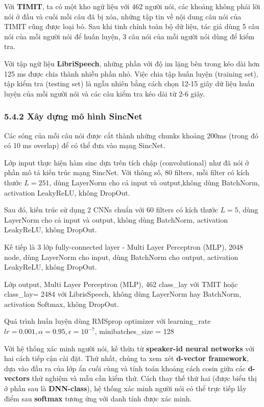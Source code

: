 \documentclass{article}
\begin{document}
	Với \textbf{TIMIT}, ta có một kho ngữ liệu với 462 người nói, các khoảng không phải lời nói ở đầu và cuối mỗi câu đã bị xóa, những tập tin về nội dung câu nói của TIMIT cũng được loại bỏ. Sau khi tinh chỉnh toàn bộ dữ liệu, tác giả dùng 5 câu nói của mỗi người nói để huấn luyện, 3 câu nói của mỗi người nói dùng để kiểm tra.
	
	Với tập ngữ liệu \textbf{LibriSpeech}, những phần với độ im lặng bên trong kéo dài hơn 125 ms được chia thành nhiều phần nhỏ. Việc chia tập huấn luyện (training set), tập kiểm tra (testing set) là ngẫu nhiên bằng cách chọn 12-15 giây dữ liệu huấn luyện của mỗi người nói và các câu kiểm tra kéo dài từ 2-6 giây. 
	
	\subsubsection{5.4.2 Xây dựng mô hình SincNet}
	\qquad Các sóng của mỗi câu nói được cắt thành những chunks khoảng 200ms (trong đó có 10 ms overlap) để có thể đưa vào mạng SincNet.
	
	Lớp input thực hiện hàm sinc dựa trên tích chập (convolutional) như đã nói ở phần mô tả kiến trúc mạng SincNet. Với thông số, 80 filters, mỗi filter có kích thước $L = 251$, dùng LayerNorm cho cả input và output,không dùng BatchNorm, activation LeakyReLU, không DropOut.
		
	Sau đó, kiến trúc sử dụng 2 CNNs chuẩn với 60 filters có kích thước $L = 5$, dùng LayerNorm cho cả input và output, không dùng BatchNorm, activation LeakyReLU, không DropOut.
	
	Kế tiếp là 3 lớp fully-connected layer - Multi Layer Perceptron (MLP), 2048 node, dùng LayerNorm cho input, dùng BatchNorm cho output, activation LeakyReLU, không DropOut.
	
	Lớp output, Multi Layer Perceptron (MLP), 462 class\_lay với TMIT hoặc class\_lay= 2484 với LibrisSpeech, không dùng LayerNorm hay BatchNorm, activation Softmax, không DropOut.
	
	Quá trình huấn luyện dùng RMSprop optimizer với learning\_rate $lr = 0.001, \alpha = 0.95, \epsilon = 10^{-7}$, minibatches\_size = 128
	
	Với hệ thống xác minh người nói, kế thừa từ \textbf{speaker-id neural networks} với hai cách tiếp cận cài đặt. Thứ nhất, chúng ta xem xét \textbf{d-vector framework}, dựa vào đầu ra của lớp ẩn cuối cùng và tính toán khoảng cách cosin giữa các \textbf{d-vectors} thử nghiệm và mẫu cần kiểm thử. Cách thay thế thứ hai (được biểu thị ở phần sau là \textbf{DNN-class}), hệ thống xác minh người nói có thể trực tiếp lấy điểm sau \textbf{softmax} tương ứng với danh tính được xác minh.
	
\end{document}
